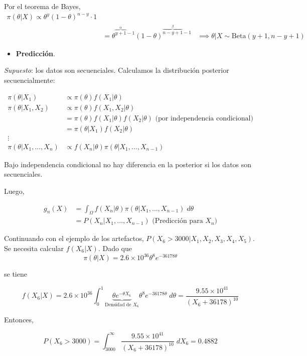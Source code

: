 \documentclass[
  12pt,
]{book}
\providecommand{\tightlist}{%
  \setlength{\itemsep}{0pt}\setlength{\parskip}{0pt}}
\begin{document}
Por el teorema de Bayes,
\begin{align*}
\pi(\theta|X) \propto \theta^y (1-\theta)^{n-y}\cdot 1  \\
&= \theta^{\overbrace{y+1}^{\alpha}-1}(1-\theta)^{\overbrace{n-y+1}^{\beta}-1}
&\implies \theta|X \sim \text{Beta}(y+1,n-y+1)
\end{align*}

\begin{itemize}
\tightlist
\item
  \textbf{Predicción}.
\end{itemize}

\emph{Supuesto}: los datos son secuenciales. Calculamos la distribución posterior
secuencialmente:

\begin{align*}
\pi(\theta|X_1) & \propto \pi(\theta) f(X_1|\theta)\\
\pi(\theta|X_1,X_2) &\propto \pi(\theta) f(X_1,X_2|\theta) \\
&= \pi(\theta) f(X_1|\theta) f(X_2|\theta) \text{ (por independencia condicional)}
\\ & = \pi(\theta|X_1)f(X_2|\theta)\\
\vdots &  \\
\pi(\theta|X_1,\dots,X_n) & \propto f(X_n|\theta)\pi(\theta|X_1,\dots, X_{n-1})
\end{align*}

Bajo independencia condicional no hay diferencia en la posterior si los datos
son secuenciales.

Luego,

\begin{align*} 
g_n(X) & = \int_{\Omega} f(X_n|\theta) \pi(\theta|X_1,\dots, X_{n-1})\;d\theta\\
& = P(X_n|X_1,\dots,X_{n-1}) \text{ (Predicción para }X_n)
\end{align*}

Continuando con el ejemplo de los artefactos, \(P(X_6>3000|X_1,X_2,X_3,X_4,X_5)\).
Se necesita calcular \(f(X_6|X)\). Dado que \[ \pi(\theta|X) = 2.6\times
10^{36}\theta^8 e^{-36178\theta}\]

se tiene

\[ f(X_6|X) = 2.6\times 10^{36} \int_{0}^1 \underbrace{\theta e^{-\theta
X_6}}_{\text{Densidad de } X_6}\theta^8 e^{-36178\theta}\;d\theta = \dfrac{9.55
\times 10^{41}}{(X_6+36178)^{10}}\]

Entonces,

\[ P(X_6>3000) =
\int_{3000}^{\infty} \dfrac{9.55\times10^{41}}{(X_6+36178)^{10}}\; dX_6 =
0.4882\]
\end{document}
